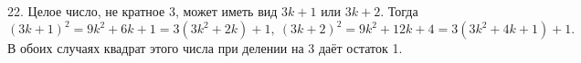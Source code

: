 22. Целое число, не кратное 3, может иметь вид $3k+1$ или $3k+2.$ Тогда $(3k+1)^2=9k^2+6k+1=3(3k^2+2k)+1,\ (3k+2)^2=9k^2+12k+4=3(3k^2+4k+1)+1.$ В обоих случаях квадрат этого числа при делении на 3 даёт остаток 1.\\
